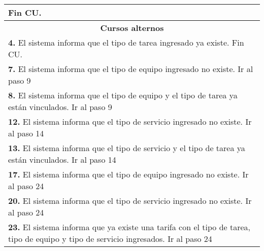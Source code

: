 \documentclass[12pt]{extarticle}
\begin{document}
\begin{longtable}{ |p{8cm}|p{8cm}| }
			\inc Fin CU. & \\
		\hline
		\multicolumn{2}{|c|}{\textbf{Cursos alternos}}\\
		\hline
		\multicolumn{2}{|p{16cm}|}{\textbf{4. }El sistema informa que el tipo de tarea ingresado ya existe. Fin CU.}\\
		\hline
		\multicolumn{2}{|p{16cm}|}{\textbf{7. }El sistema informa que el tipo de equipo ingresado no existe. Ir al paso 9}\\
		\hline	
		\multicolumn{2}{|p{16cm}|}{\textbf{8. }El sistema informa que el tipo de equipo y el tipo de tarea ya están vinculados. Ir al paso 9}\\
		\hline	
		\multicolumn{2}{|p{16cm}|}{\textbf{12. }El sistema informa que el tipo de servicio ingresado no existe. Ir al paso 14}\\
		\hline	
		\multicolumn{2}{|p{16cm}|}{\textbf{13. }El sistema informa que el tipo de servicio y el tipo de tarea ya están vinculados. Ir al paso 14}\\
		\hline	
		\multicolumn{2}{|p{16cm}|}{\textbf{17. }El sistema informa que el tipo de equipo ingresado no existe. Ir al paso 24}\\
		\hline	
		\multicolumn{2}{|p{16cm}|}{\textbf{20. }El sistema informa que el tipo de servicio ingresado no existe. Ir al paso 24}\\
		\hline	
		\multicolumn{2}{|p{16cm}|}{\textbf{23. }El sistema informa que ya existe una tarifa con el tipo de tarea, tipo de equipo y tipo de servicio ingresados. Ir al paso 24}\\
		\hline	
	\end{longtable}

    \resetinc{}
    \raya{}
\end{document}
